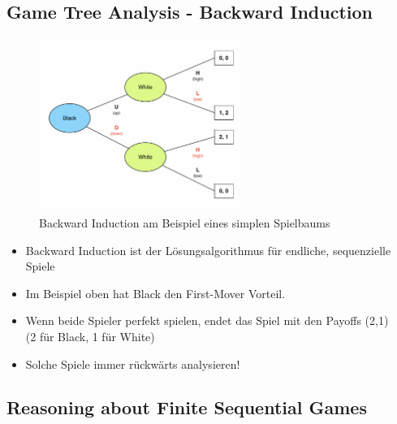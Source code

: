 \documentclass[a4paper]{article}
\begin{document}
		\newpage
	
		\subsection{Game Tree Analysis - Backward Induction}
		
		\begin{figure}[htb!]
			\centering
			\includegraphics[width=0.6\textwidth]{img/01_sequential_games/gametree_backward_induction.png}
			\caption{Backward Induction am Beispiel eines simplen Spielbaums}
			\label{fig:01_seq_backward_induction}
		\end{figure}
	
		\begin{itemize}
			\item Backward Induction ist der Lösungsalgorithmus für endliche, sequenzielle Spiele
			\item Im Beispiel oben hat Black den First-Mover Vorteil.
			\item Wenn beide Spieler perfekt spielen, endet das Spiel mit den Payoffs (2,1) \\
				(2 für Black, 1 für White)
			\item Solche Spiele immer rückwärts analysieren!
		\end{itemize}
	
		\subsection{Reasoning about Finite Sequential Games}
		
\end{document}
